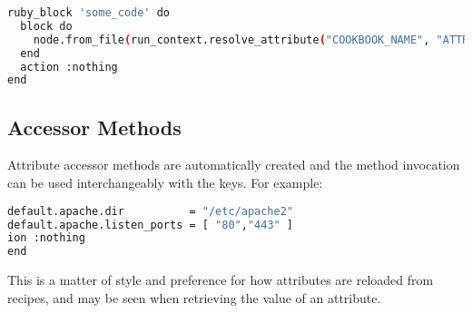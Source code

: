 \begin{lstlisting}[language=Bash,label=lst:cookbook-recipes11]
ruby_block 'some_code' do
  block do
    node.from_file(run_context.resolve_attribute("COOKBOOK_NAME", "ATTR_FILE"))
  end
  action :nothing
end
\end{lstlisting}

\subsection{Accessor Methods}

Attribute accessor methods are automatically created and the method invocation can be used interchangeably with the keys. For example:

\begin{lstlisting}[language=Bash,label=lst:cookbook-recipes12]
default.apache.dir          = "/etc/apache2"
default.apache.listen_ports = [ "80","443" ]
ion :nothing
end
\end{lstlisting}

This is a matter of style and preference for how attributes are reloaded from recipes, and may be seen when retrieving the value of an attribute.